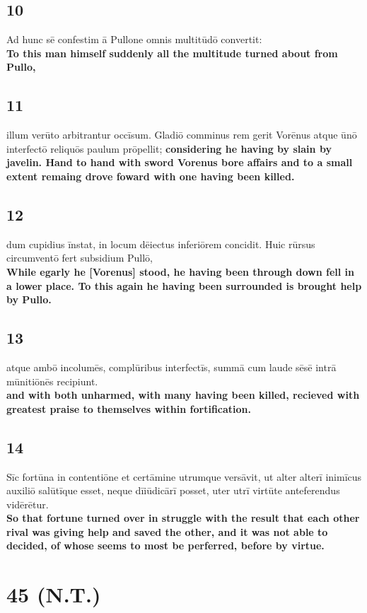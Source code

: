 \documentclass{article}
\begin{document}
\subsection*{10}
Ad hunc sē confestim ā Pullone omnis multitūdō convertit: \\
\textbf{To this man himself suddenly all the multitude turned about from Pullo,}

\subsection*{11}
illum verūto arbitrantur occīsum. Gladiō comminus rem gerit Vorēnus atque ūnō interfectō reliquōs paulum prōpellit; 
\textbf{considering he having by slain by javelin. Hand to hand with sword Vorenus bore affairs and to a small extent remaing drove foward with one having been killed.}

\subsection*{12}
dum cupidius īnstat, in locum dēiectus inferiōrem concidit. Huic rūrsus circumventō fert subsidium Pullō, \\
\textbf{While egarly he [Vorenus] stood, he having been through down fell in a lower place. To this again he having been surrounded is brought help by Pullo.}

\subsection*{13}
atque ambō incolumēs, complūribus interfectīs, summā cum laude sēsē intrā mūnitiōnēs recipiunt. \\
\textbf{and with both unharmed, with many having been killed, recieved with greatest praise to themselves within fortification.}

\subsection*{14}
Sīc fortūna in contentiōne et certāmine utrumque versāvit, ut alter alterī inimīcus auxiliō salūtīque esset, neque dīiūdicārī posset, uter utrī virtūte anteferendus vidērētur.\\
\textbf{So that fortune turned over in struggle with the result that each other rival was giving help and saved the other, and it was not able to decided, of whose seems to most be perferred, before by virtue.}


\section*{45 (N.T.)}
\end{document}
